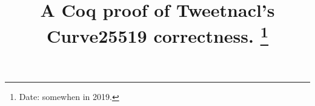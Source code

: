 \documentclass[conference, 9pt]{IEEEtran}
\newif\ifpublic
\begin{document}
\date{}

\title{\Large \bf A Coq proof of Tweetnacl's Curve25519 correctness.%
\thanks{
Date: somewhen in 2019.}
}

\ifpublic
\author{
{\rm Peter Schwabe}\\
  Radboud University, The Netherlands\\
\and
{\rm Beno\^it Viguier}\\
  Radboud University, The Netherlands\\
\and
{\rm Timmy Weerwag}\\
  Radboud University, The Netherlands\\
\and
{\rm Freek Wiedijk}\\
  Radboud University, The Netherlands\\
}
\fi

\maketitle










\vspace*{1cm}
{\footnotesize 
}

\begin{appendix}
\end{appendix}

\listoftodos
\end{document}
